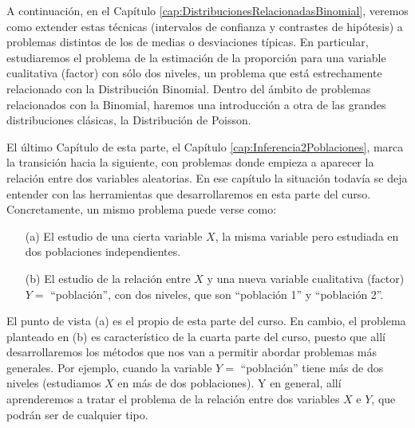 A continuación, en el Capítulo \ref{cap:DistribucionesRelacionadasBinomial}, veremos como extender estas técnicas (intervalos de confianza y contrastes de hipótesis) a problemas distintos de los de medias o desviaciones típicas. En particular, estudiaremos el problema de la estimación de la {\sf proporción} para una variable cualitativa (factor) con sólo dos niveles, un problema que está estrechamente relacionado con la Distribución Binomial. Dentro del ámbito de problemas relacionados con la Binomial, haremos una
introducción a otra de las grandes distribuciones clásicas, la {\sf Distribución de Poisson}.

El último Capítulo de esta parte, el Capítulo \ref{cap:Inferencia2Poblaciones}, marca la transición hacia la siguiente, con problemas donde empieza a aparecer la relación entre dos variables aleatorias. En ese capítulo la situación todavía se deja entender con las herramientas que desarrollaremos en  esta parte del curso. Concretamente, un mismo problema puede verse como:
\begin{itemize}
  \item[(a)] El estudio de una cierta variable $X$, la misma variable pero estudiada en dos poblaciones independientes.
  \item[(b)] El estudio de la relación entre $X$ y una nueva variable cualitativa (factor) $Y=$ ``población'', con dos niveles, que son ``población 1'' y ``población 2''.
\end{itemize}
El punto de vista (a) es el propio de esta parte del curso. En cambio, el problema planteado en (b) es característico de la cuarta parte del curso, puesto que allí desarrollaremos los métodos que nos van a permitir abordar problemas más generales. Por ejemplo, cuando la variable $Y=$ ``población'' tiene más de dos niveles (estudiamos $X$ en más de dos poblaciones). Y en general, allí aprenderemos a tratar el problema de la relación entre dos variables $X$ e $Y$, que podrán ser de  cualquier tipo.

